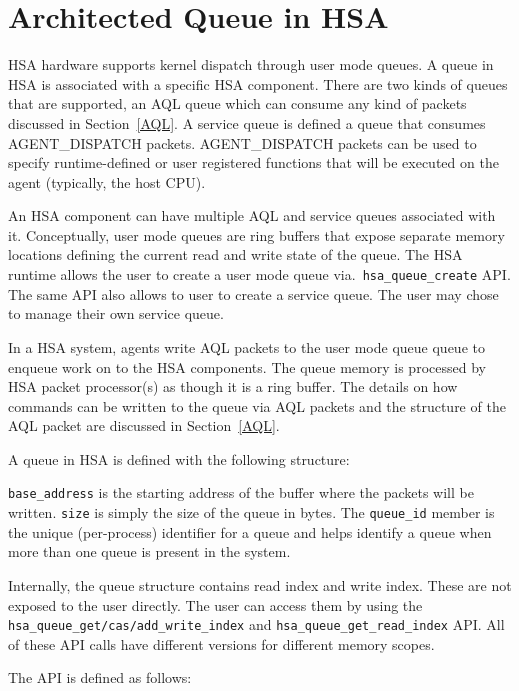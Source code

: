 \hypertarget{architected\_queue}{} \section{Architected Queue in
H\-S\-A} \label{architected_queue}

H\-S\-A hardware supports kernel dispatch through user mode queues.
A queue in HSA is associated with a specific HSA component. There
are two kinds of queues that are supported, an AQL queue which can
consume any kind of packets discussed in Section~\ref{AQL}. A
service queue is defined a queue that consumes AGENT\_DISPATCH
packets. AGENT\_DISPATCH packets can be used to specify
runtime-defined or user registered functions that will be executed
on the agent (typically, the host CPU). 

An HSA component can have multiple AQL and service queues associated
with it.  Conceptually, user mode queues are ring buffers that
expose separate memory locations defining the current read and write
state of the queue. The HSA runtime allows the user to create a user
mode queue via.\ \texttt{hsa\_queue\_create} API. The same API also
allows to user to create a service queue. The user may chose to
manage their own service queue.

In a HSA system, agents write AQL packets to the user mode queue
queue to enqueue work on to the HSA components. The queue memory is
processed by HSA packet processor(s) as though it is a ring buffer.
The details on how commands can be written to the queue via AQL
packets and the structure of the AQL packet are discussed in
Section~\ref{AQL}.


A queue in HSA is defined with the following structure:



\texttt{base\_address} is the starting address of the buffer where
the packets will be written.  \texttt{size} is simply the size of
the queue in bytes.  The \texttt{queue\-\_\-id} member is the unique
(per-process) identifier for a queue and helps identify a queue when
more than one queue is present in the system.

Internally, the queue structure contains read index and write index.
These are not exposed to the user directly. The user can access them
by using the \texttt{hsa\_queue\_get/cas/add\_write\_index} and
\texttt{hsa\_queue\_get\_read\_index} API. All of these API calls
have different versions for different memory scopes.

The API is defined as follows:

